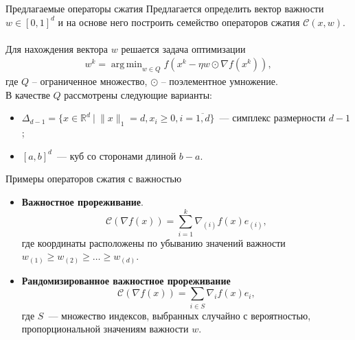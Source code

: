 \documentclass{beamer}
\DeclareMathOperator*{\argmin}{arg\,min}
\begin{document}

\begin{frame}{Предлагаемые операторы сжатия}
    Предлагается определить вектор важности $w \in [0, 1]^d$ и на основе  него построить семейство операторов сжатия $\mathcal{C}(x, w)$.\\
    $ $\\
    Для нахождения вектора $w$ решается задача оптимизации
    \begin{align*}
     w^k = \argmin_{w \in Q} f(x^k - \eta w \odot \nabla f(x^k)),
    \end{align*}
    где $Q$ -- ограниченное множество, $\odot$ -- поэлементное умножение.\\

    В качестве $Q$ рассмотрены следующие варианты:
    \begin{itemize}
        \item $\Delta_{d - 1} = \{x \in \mathbb{R}^d ~|~ \|x\|_1 = d, x_i \geq 0, i = \overline{1, d}\}$~--- симплекс размерности $d - 1$;
        \item $[a, b]^d$~--- куб со сторонами длиной $b - a$.
    \end{itemize}
\end{frame}


\begin{frame}{Примеры операторов сжатия с важностью}
    \begin{itemize}
        \item \textbf{Важностное прореживание}.\\
        \begin{equation}
            \mathcal{C}(\nabla f(x)) = \sum_{i=1}^k \nabla_{(i)} f(x) e_{(i)},
        \end{equation}
        где координаты расположены по убыванию значений важности $w_{(1)} \geq w_{(2)} \geq \dots \geq w_{(d)}$.
        \item \textbf{Рандомизированное важностное прореживание}\\
        \begin{equation}
            \mathcal{C}(\nabla f(x)) = \sum_{i \in S} \nabla_i f(x) e_i,
        \end{equation}
        где $S$~--- множество индексов, выбранных случайно с вероятностью, пропорциональной значениям важности $w$.
    \end{itemize}
\end{frame}
\end{document}
